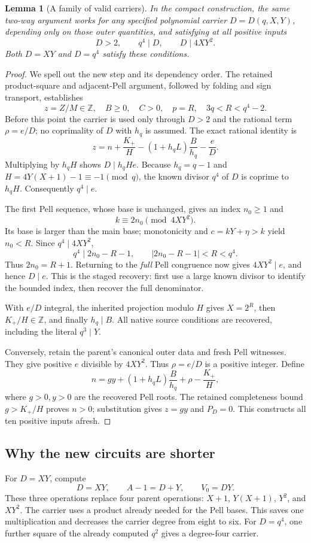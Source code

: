 \documentclass[11pt,letterpaper]{article}
\newtheorem{lemma}[theorem]{Lemma}
\theoremstyle{definition}\newtheorem{definition}[theorem]{Definition}
\theoremstyle{remark}\newtheorem{remark}[theorem]{Remark}
\newcommand{\Z}{\ensuremath{\mathbb Z}}
\begin{document}
\begin{lemma}[A family of valid carriers]\label{lem:carrier}
In the compact construction, the same two-way argument works for any specified polynomial carrier \(D=D(q,X,Y)\), depending only on those outer quantities, and satisfying at all positive inputs
\[
 D>2,\qquad q^4\mid D,\qquad D\mid4XY^2.
\]
Both \(D=XY\) and \(D=q^4\) satisfy these conditions.
\end{lemma}
\begin{proof}
We spell out the new step and its dependency order. The retained product-square and adjacent-Pell argument, followed by folding and sign transport, establishes
\[
 z=Z/M\in\Z,\quad B\ge0,\quad C>0,\quad p=R,
 \quad 3q<R<q^4-2.
\]
Before this point the carrier is used only through \(D>2\) and the rational term \(\rho=e/D\); no coprimality of \(D\) with \(h_q\) is assumed. The exact rational identity is
\[
 z=n+\frac{K_+}{H}-(1+h_qL)\frac{B}{h_q}-\frac eD.
\]
Multiplying by \(h_qH\) shows \(D\mid h_qHe\). Because
\(h_q=q-1\) and \(H=4Y(X+1)-1\equiv-1\pmod q\), the known divisor \(q^4\) of \(D\) is coprime to \(h_qH\). Consequently \(q^4\mid e\).

The first Pell sequence, whose base is unchanged, gives an index \(n_0\ge1\) and
\[
 k\equiv2n_0\pmod{4XY^2}.
\]
Its base is larger than the main base; monotonicity and \(c=kY+\eta>k\) yield \(n_0<R\). Since \(q^4\mid4XY^2\),
\[
 q^4\mid2n_0-R-1,\qquad |2n_0-R-1|<R<q^4.
\]
Thus \(2n_0=R+1\). Returning to the \emph{full} Pell congruence now gives \(4XY^2\mid e\), and hence \(D\mid e\). This is the staged recovery: first use a large known divisor to identify the bounded index, then recover the full denominator.

With \(e/D\) integral, the inherited projection modulo \(H\) gives \(X=2^R\), then \(K_+/H\in\Z\), and finally \(h_q\mid B\). All native source conditions are recovered, including the literal \(q^3\mid Y\).

Conversely, retain the parent's canonical outer data and fresh Pell witnesses. They give positive \(e\) divisible by \(4XY^2\). Thus \(\rho=e/D\) is a positive integer. Define
\[
 n=gy+(1+h_qL)\frac{B}{h_q}+\rho-\frac{K_+}{H},
\]
where \(g>0,y>0\) are the recovered Pell roots. The retained completeness bound \(g>K_+/H\) proves \(n>0\); substitution gives \(z=gy\) and \(P_D=0\). This constructs all ten positive inputs afresh.
\end{proof}

\subsection{Why the new circuits are shorter}
For \(D=XY\), compute
\[
 D=XY,\qquad A-1=D+Y,\qquad V_0=DY.
\]
These three operations replace four parent operations:
\(X+1\), \(Y(X+1)\), \(Y^2\), and \(X Y^2\). The carrier uses a product already needed for the Pell bases. This saves one multiplication and decreases the carrier degree from eight to six. For \(D=q^4\), one further square of the already computed \(q^2\) gives a degree-four carrier.
\end{document}
